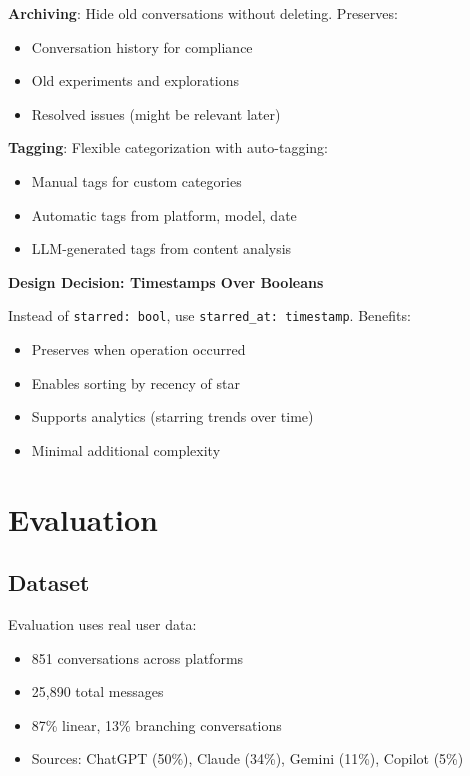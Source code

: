 \documentclass[11pt,letterpaper]{article}
\begin{document}
\textbf{Archiving}: Hide old conversations without deleting. Preserves:
\begin{itemize}
    \item Conversation history for compliance
    \item Old experiments and explorations
    \item Resolved issues (might be relevant later)
\end{itemize}

\textbf{Tagging}: Flexible categorization with auto-tagging:
\begin{itemize}
    \item Manual tags for custom categories
    \item Automatic tags from platform, model, date
    \item LLM-generated tags from content analysis
\end{itemize}

\textbf{Design Decision: Timestamps Over Booleans}

Instead of \texttt{starred: bool}, use \texttt{starred\_at: timestamp}. Benefits:

\begin{itemize}
    \item Preserves when operation occurred
    \item Enables sorting by recency of star
    \item Supports analytics (starring trends over time)
    \item Minimal additional complexity
\end{itemize}

\section{Evaluation}
\label{sec:evaluation}

\subsection{Dataset}

Evaluation uses real user data:

\begin{itemize}
    \item 851 conversations across platforms
    \item 25,890 total messages
    \item 87\% linear, 13\% branching conversations
    \item Sources: ChatGPT (50\%), Claude (34\%), Gemini (11\%), Copilot (5\%)
\end{itemize}
\end{document}
